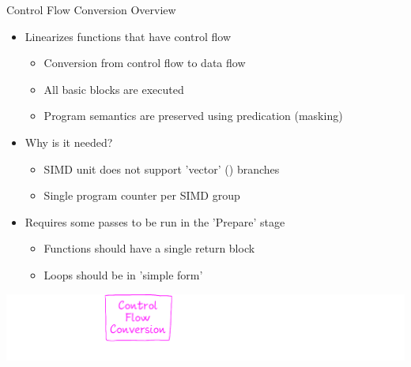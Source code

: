 
\begin{frame}{Control Flow Conversion Overview}

\begin{itemize}
    \item Linearizes functions that have  control flow
    \begin{itemize}
        \item Conversion from control flow to data flow
        \item All basic blocks are executed
        \item Program semantics are preserved using predication (masking)
    \end{itemize}
    \item Why is it needed?
    \begin{itemize}
        \item SIMD unit does not support 'vector' () branches
        \item Single program counter per SIMD group
    \end{itemize}
    \item Requires some passes to be run in the 'Prepare' stage
    \begin{itemize}
        \item Functions should have a single return block
        \item Loops should be in 'simple form'
    \end{itemize}
\end{itemize}

\vfill
\hspace{1em}\includegraphics[scale=0.55]{images/stages-control-flow.pdf}

\end{frame}


